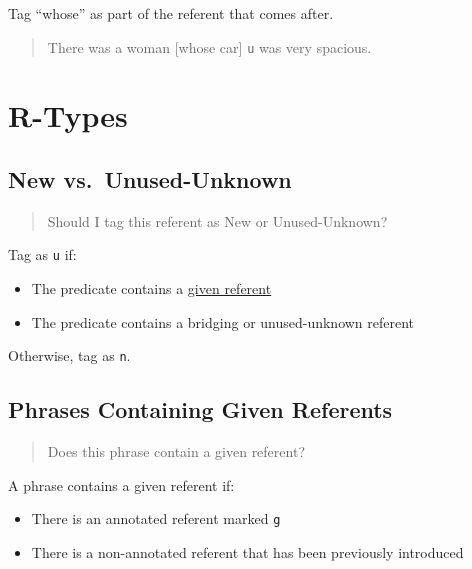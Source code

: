 \documentclass[
]{book}
\providecommand{\tightlist}{%
  \setlength{\itemsep}{0pt}\setlength{\parskip}{0pt}}
\begin{document}
Tag ``whose'' as part of the referent that comes after.

\begin{quote}
There was a woman {[}whose car{]} \texttt{u} was very spacious.
\end{quote}

\hypertarget{r-types}{%
\section{R-Types}\label{r-types}}

\hypertarget{new-vs.-unused-unknown}{%
\subsection{New vs.~Unused-Unknown}\label{new-vs.-unused-unknown}}

\begin{quote}
Should I tag this referent as New or Unused-Unknown?
\end{quote}

Tag as \texttt{u} if:

\begin{itemize}
\tightlist
\item
  The predicate contains a \protect\hyperlink{phrases-containing-given-referents}{given referent}
\item
  The predicate contains a bridging or unused-unknown referent
\end{itemize}

Otherwise, tag as \texttt{n}.

\hypertarget{phrases-containing-given-referents}{%
\subsection{Phrases Containing Given Referents}\label{phrases-containing-given-referents}}

\begin{quote}
Does this phrase contain a given referent?
\end{quote}

A phrase contains a given referent if:

\begin{itemize}
\item
  There is an annotated referent marked \texttt{g}
\item
  There is a non-annotated referent that has been previously introduced
\end{itemize}
\end{document}
